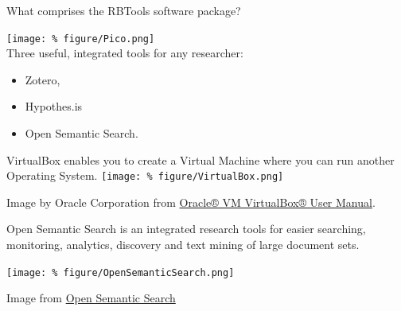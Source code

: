 \documentclass[unknownkeysallowed,usepdftitle=false, parskip=full]{beamer}
\newcommand{\secvariable}{nothing}
\newcommand{\mysection}[1]{\renewcommand{\secvariable}{#1}
}
\begin{document}
\mysection{radar}
\begin{frame}\label{\secvariable}

What comprises the RBTools software package?

\texttt{[image: \%
figure/Pico.png]}\\

Three useful, integrated tools for any researcher:
\begin{itemize}
    \item Zotero,
    \item Hypothes.is 
    \item Open Semantic Search.
    \end{itemize}

\end{frame}

\mysection{line}
\begin{frame}\label{\secvariable}

VirtualBox enables you to create a Virtual Machine where you can run another Operating System.
  \vspace{0.5cm}
  \texttt{[image: \%
figure/VirtualBox.png]}  

Image by Oracle Corporation from \href{https://www.virtualbox.org/manual/}{Oracle® VM VirtualBox® User Manual}.

\end{frame}

\mysection{major}
\begin{frame}\label{\secvariable} %

Open Semantic Search is an integrated research tools for easier searching, monitoring, analytics, discovery and text mining of large document sets.
  \vspace{0.5cm}

\texttt{[image: \%
figure/OpenSemanticSearch.png]}  

Image from \href{https://www.opensemanticsearch.org/doc/search}{Open Semantic Search}

\end{frame}
\end{document}
